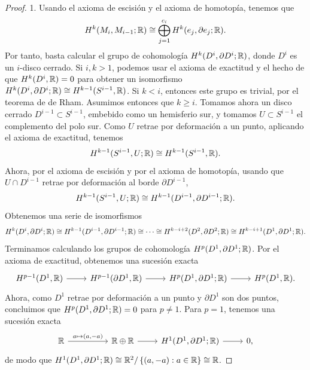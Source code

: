 \documentclass[11pt,a4paper]{amsbook}
\theoremstyle{remark} \newtheorem{rmk}[subsection]{Observación}
\theoremstyle{definition} \newtheorem{defn}[subsection]{Definición}
\theoremstyle{definition} \newtheorem{ex}[subsection]{Ejemplo}
\theoremstyle{definition} \newtheorem{ej}[subsection]{Ejercicio}
\begin{document}
\begin{proof}
  1. Usando el axioma de escisión y el axioma de homotopía, tenemos que
  \begin{equation*}
H^k(M_i,M_{i-1};\mathbb R) \cong \bigoplus_{j=1}^{c_i} H^k(e_j,\partial e_j;\mathbb R).
  \end{equation*}
  Por tanto, basta calcular el grupo de cohomología $H^k(D^i,\partial D^i;\mathbb R)$, donde $D^i$ es un $i$-disco cerrado. Si $i,k>1$, podemos usar el axioma de exactitud y el hecho de que $H^k(D^i,\mathbb R) = 0$ para obtener un isomorfismo $H^k(D^i,\partial D^i;\mathbb R) \cong H^{k-1}(S^{i-1},\mathbb R)$. Si $k<i$, entonces este grupo es trivial, por el teorema de de Rham. Asumimos entonces que $k\geq i$. Tomamos ahora un disco cerrado $D^{i-1}\subset S^{i-1}$, embebido como un hemisferio sur, y tomamos $U\subset S^{i-1}$ el complemento del polo sur. Como $U$ retrae por deformación a un punto, aplicando el axioma de exactitud, tenemos
  \begin{equation*}
H^{k-1}(S^{i-1},U;\mathbb R) \cong H^{k-1}(S^{i-1},\mathbb R).
  \end{equation*}
  Ahora, por el axioma de escisión y por el axioma de homotopía, usando que $U\cap D^{i-1}$ retrae por deformación al borde $\partial D^{i-1}$,
  \begin{equation*}
H^{k-1}(S^{i-1},U;\mathbb R) \cong H^{k-1}(D^{i-1},\partial D^{i-1};\mathbb R).
  \end{equation*}
  Obtenemos una serie de isomorfismos
  \begin{equation*}
H^{k}(D^i,\partial D^i;\mathbb R) \cong H^{k-1}(D^{i-1},\partial D^{i-1};\mathbb R) \cong \cdots \cong H^{k-i+2}(D^2,\partial D^2;\mathbb R) \cong H^{k-i+1}(D^1,\partial D^1;\mathbb R).
  \end{equation*}
  Terminamos calculando los grupos de cohomología $H^p(D^1,\partial D^1;\mathbb R)$. Por el axioma de exactitud, obtenemos una sucesión exacta
  \begin{equation*}
      \begin{tikzcd}
H^{p-1}(D^1,\RR)  \rar & H^{p-1}(\partial D^1,\RR) \rar & H^{p}(D^1,\partial D^1;\RR) \rar & H^{p}(D^1,\RR) .
      \end{tikzcd}
  \end{equation*}
 Ahora, como $D^1$ retrae por deformación a un punto y $\partial D^1$ son dos puntos, concluimos que $H^p(D^1,\partial D^1;\mathbb R)=0$ para $p\neq 1$. Para $p=1$, tenemos una sucesión exacta
\begin{equation*}
  \begin{tikzcd}
\RR \ar{rr}{a \mapsto (a,-a)} && \RR \oplus \RR \rar & H^1(D^1,\partial D^1;\RR) \rar & 0,
  \end{tikzcd}
\end{equation*}
de modo que $H^1(D^1,\partial D^1;\mathbb R) \cong \mathbb R^2 / \left\{ (a,-a) : a\in \mathbb R \right\} \cong \mathbb R$.


\end{proof}
\end{document}
